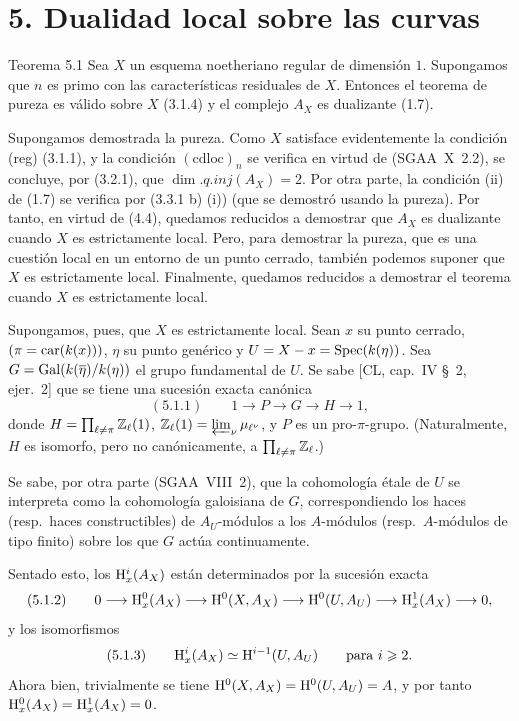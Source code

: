 \section*{5. Dualidad local sobre las curvas}

\begin{statement}{Teorema 5.1}
Sea $X$ un esquema noetheriano regular de dimensión $1$. Supongamos que $n$ es primo con las características residuales de $X$. Entonces el teorema de pureza es válido sobre $X$ (3.1.4) y el complejo $A_X$ es dualizante (1.7).
\end{statement}

\begin{prooftext}[Demostración]
Supongamos demostrada la pureza. Como $X$ satisface evidentemente la condición (reg) (3.1.1), y la condición $(\mathrm{cdloc})_n$ se verifica en virtud de (SGAA~X~2.2), se concluye, por (3.2.1), que $\dim.q.inj(A_X)=2$. Por otra parte, la condición (ii) de (1.7) se verifica por (3.3.1 b) (i)) (que se demostró usando la pureza). Por tanto, en virtud de (4.4), quedamos reducidos a demostrar que $A_X$ es dualizante cuando $X$ es estrictamente local. Pero, para demostrar la pureza, que es una cuestión local en un entorno de un punto cerrado, también podemos suponer que $X$ es estrictamente local. Finalmente, quedamos reducidos a demostrar el teorema cuando $X$ es estrictamente local.

Supongamos, pues, que $X$ es estrictamente local. Sean $x$ su punto cerrado, $(\pi=\operatorname{car}(k(x)))$, $\eta$ su punto genérico y $U=X-x=\operatorname{Spec}(k(\eta))$. Sea $G=\operatorname{Gal}(k(\overline{\eta})/k(\eta))$ el grupo fundamental de $U$. Se sabe [CL, cap.~IV \S~2, ejer.~2] que se tiene una sucesión exacta canónica
\[
(5.1.1)\qquad 1\longrightarrow P\longrightarrow G\longrightarrow H\longrightarrow1,
\]
donde $H=\prod_{\ell\ne\pi}\mathbb{Z}_\ell(1)$, $\mathbb{Z}_\ell(1)=\varprojlim_{\nu} \mu_{\ell^\nu}$, y $P$ es un pro-$\pi$-grupo. (Naturalmente, $H$ es isomorfo, pero no canónicamente, a $\prod_{\ell\ne\pi}\mathbb{Z}_\ell$.)

Se sabe, por otra parte (SGAA~VIII~2), que la cohomología étale de $U$ se interpreta como la cohomología galoisiana de $G$, correspondiendo los haces (resp.~haces constructibles) de $A_U$-módulos a los $A$-módulos (resp.~$A$-módulos de tipo finito) sobre los que $G$ actúa continuamente.

Sentado esto, los $\mathrm{H}_x^i(A_X)$ están determinados por la sucesión exacta
\[
(5.1.2)\qquad 0\longrightarrow \mathrm{H}_x^0(A_X)\longrightarrow \mathrm{H}^0(X,A_X)\longrightarrow \mathrm{H}^0(U,A_U)\longrightarrow \mathrm{H}_x^1(A_X)\longrightarrow0,
\]
y los isomorfismos
\[
(5.1.3)\qquad \mathrm{H}_x^i(A_X)\simeq \mathrm{H}^{i-1}(U,A_U)\qquad\text{para }i\geqslant2.
\]
Ahora bien, trivialmente se tiene $\mathrm{H}^0(X,A_X)=\mathrm{H}^0(U,A_U)=A$, y por tanto $\mathrm{H}_x^0(A_X)=\mathrm{H}_x^1(A_X)=0$.


\end{prooftext}
